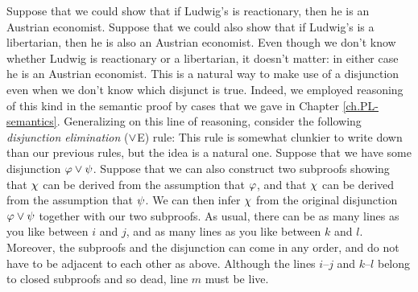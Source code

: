 Suppose that we could show that if Ludwig's is reactionary, then he is an Austrian economist.
Suppose that we could also show that if Ludwig's is a libertarian, then he is also an Austrian economist.
Even though we don't know whether Ludwig is reactionary or a libertarian, it doesn't matter: in either case he is an Austrian economist.
This is a natural way to make use of a disjunction even when we don't know which disjunct is true.
Indeed, we employed reasoning of this kind in the semantic proof by cases that we gave in Chapter \ref{ch.PL-semantics}.
Generalizing on this line of reasoning, consider the following \textit{disjunction elimination} ($\vee$E) rule:
This rule is somewhat clunkier to write down than our previous rules, but the idea is a natural one.
Suppose that we have some disjunction $\varphi \vee \psi$.
Suppose that we can also construct two subproofs showing that $\chi$ can be derived from the assumption that $\varphi$, and that $\chi$ can be derived from the assumption that $\psi$.
We can then infer $\chi$ from the original disjunction $\varphi \vee \psi$ together with our two subproofs.
As usual, there can be as many lines as you like between $i$ and $j$, and as many lines as you like between $k$ and $l$.
Moreover, the subproofs and the disjunction can come in any order, and do not have to be adjacent to each other as above.
Although the lines $i$--$j$ and $k$--$l$ belong to closed subproofs and so dead, line $m$ must be live.

